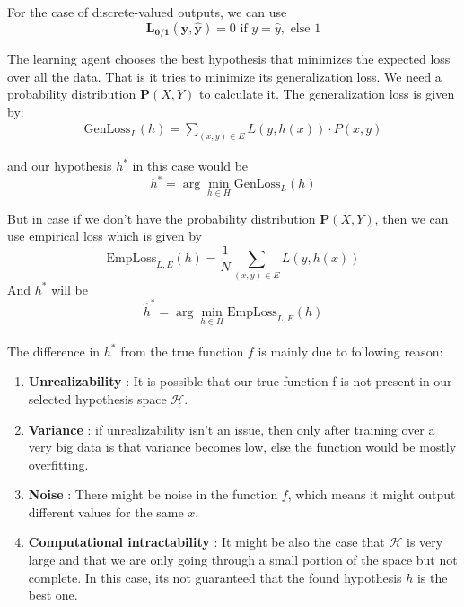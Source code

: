 \documentclass{article}
\begin{document}
    For the case of discrete-valued outputs, we can use
    \begin{equation*}
      \mathbf{L_{0/1}(y, \hat{y})} = 0 \text{ if } y = \hat{y}, \text{ else } 1
    \end{equation*}

    The learning agent chooses the best hypothesis that minimizes the expected loss over all the data. 
    That is it tries to minimize its generalization loss. We need a probability distribution $\mathbf{P}(X,Y)$ to calculate it. 	
    The generalization loss is given by:
    \begin{align*}
      \text{GenLoss}_L(h) = \sum_{(x, y) \in E} L(y, h(x)) \cdot P(x, y)
    \end{align*}

    and our hypothesis $h^*$ in this case would be
      \begin{equation*}
        h^* = \arg\min_{h \in H} \text{GenLoss}_L(h)
      \end{equation*}

     But in case if we don’t have the probability distribution $\mathbf{P}(X,Y)$, then we can use empirical loss which is given by
      \begin{equation*}
        \text{EmpLoss}_{L, E}(h) = \frac{1}{N} \sum_{(x, y) \in E} L(y, h(x))
      \end{equation*}
    And $h^*$ will be
      \begin{equation*}
        \hat{h}^* = \arg\min_{h \in H} \text{EmpLoss}_{L, E}(h)
      \end{equation*}

  \paragraph{}
    The difference in $h^*$ from the true function $f$ is mainly due to following reason:
      \begin{enumerate}
        \item \textbf{Unrealizability} : It is possible that our true function f is not present in our selected hypothesis space $\mathcal{H}$. 
        \item \textbf{Variance} : if unrealizability isn’t an issue, then only after training over a very big data is that variance becomes low, else the function would be mostly overfitting.
        \item \textbf{Noise} : There might be noise in the function $f$, which means it might output different values for the same $x$.
        \item \textbf{Computational intractability} : It might be also the case that $\mathcal{H}$ is very large and that we are only going through a small portion of the space but not complete. In this case, its not guaranteed that the found hypothesis $h$ is the best one.
      \end{enumerate}
    
\end{document}

